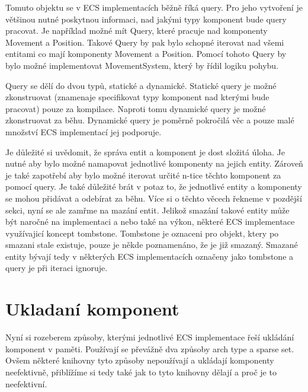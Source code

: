 Tomuto objektu se v ECS implementacích běžně říká query. Pro jeho vytvoření je většinou nutné poskytnou informaci, nad jakými typy komponent bude query pracovat. Je například možné mít Query, které pracuje nad komponenty Movement a Position. Takové Query by pak bylo schopné iterovat nad všemi entitami co mají komponenty Movement a Position. Pomocí tohoto Query by bylo možné implementovat MovementSystem, který by řídil logiku pohybu.

Query se dělí do dvou typů, statické a dynamické. Statické query je možné zkonstruovat (znamenaje specifikovat typy komponent nad kterými bude pracovat) pouze za kompilace. Naproti tomu dynamické query je možné zkonstruovat za běhu. Dynamické query je poměrně pokročilá věc a pouze malé množství ECS implementací jej podporuje.

Je důležité si uvědomit, že správa entit a komponent je dost složitá úloha. Je nutné aby bylo možné namapovat jednotlivé komponenty na jejich entity. Zároveň je také zapotřebí aby bylo možné iterovat určité n-tice těchto komponent za pomocí query. Je také důležité brát v potaz to, že jednotlivé entity a komponenty se mohou přidávat a odebírat za běhu. Více si o těchto věcech řekneme v pozdější sekci, nyní se ale zamřme na mazání entit. Jelikož smazání takové entity může být naročné na implementaci a nebo také na výkon, některé ECS implementace využívajicí koncept tombstone. Tombstone je oznaceni pro objekt, ktery po smazani stale existuje, pouze je někde poznamenáno, že je již smazaný. Smazané entity bývají tedy v některých ECS implementacích označeny jako tombstone a query je při iteraci ignoruje.





\section{Ukladaní komponent}
Nyní si rozeberem způsoby, kterými jednotlivé ECS implementace řeší ukládání komponent v paměti. Používají se převážně dva způsoby arch type a sparse set. Ovšem některé knihovny tyto způsoby nepoužívají a ukládají komponenty neefektivně, přiblížíme si tedy také jak to tyto knihovny dělají a proč je to neefektivní.

